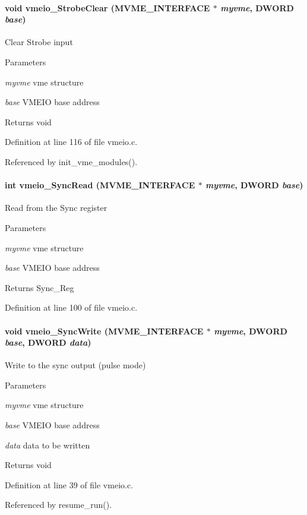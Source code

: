 \paragraph[{vmeio\_\-StrobeClear}]{\setlength{\rightskip}{0pt plus 5cm}void vmeio\_\-StrobeClear ({\bf MVME\_\-INTERFACE} $\ast$ {\em myvme}, \/  {\bf DWORD} {\em base})}\hfill\label{vmeio_8h_a6c0e26f9ea71ab16bd4adaa322cdc3bc}
Clear Strobe input 
\begin{DoxyParams}{Parameters}
\item[{\em myvme}]vme structure \item[{\em base}]VMEIO base address \end{DoxyParams}
\begin{DoxyReturn}{Returns}
void 
\end{DoxyReturn}


Definition at line 116 of file vmeio.c.

Referenced by init\_\-vme\_\-modules().
\paragraph[{vmeio\_\-SyncRead}]{\setlength{\rightskip}{0pt plus 5cm}int vmeio\_\-SyncRead ({\bf MVME\_\-INTERFACE} $\ast$ {\em myvme}, \/  {\bf DWORD} {\em base})}\hfill\label{vmeio_8h_a32066d5e2fc78836d5ac3dc4a70ac9af}
Read from the Sync register 
\begin{DoxyParams}{Parameters}
\item[{\em myvme}]vme structure \item[{\em base}]VMEIO base address \end{DoxyParams}
\begin{DoxyReturn}{Returns}
Sync\_\-Reg 
\end{DoxyReturn}


Definition at line 100 of file vmeio.c.
\paragraph[{vmeio\_\-SyncWrite}]{\setlength{\rightskip}{0pt plus 5cm}void vmeio\_\-SyncWrite ({\bf MVME\_\-INTERFACE} $\ast$ {\em myvme}, \/  {\bf DWORD} {\em base}, \/  {\bf DWORD} {\em data})}\hfill\label{vmeio_8h_a290874443aa721fdcdaad1d1eaab284e}
Write to the sync output (pulse mode) 
\begin{DoxyParams}{Parameters}
\item[{\em myvme}]vme structure \item[{\em base}]VMEIO base address \item[{\em data}]data to be written \end{DoxyParams}
\begin{DoxyReturn}{Returns}
void 
\end{DoxyReturn}


Definition at line 39 of file vmeio.c.

Referenced by resume\_\-run().